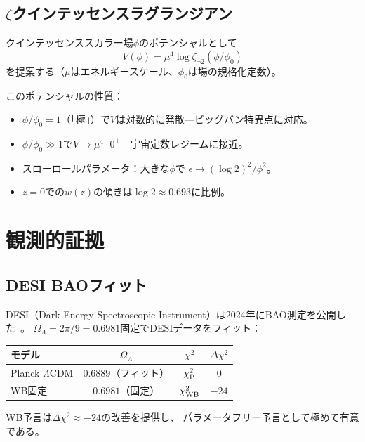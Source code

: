 \documentclass[12pt,a4paper]{article}
\theoremstyle{definition}
\newcommand{\OmL}{\Omega_\Lambda}
\newcommand{\zetanot}{\zeta_{\neg 2}}
\begin{document}
\subsection{$\zeta$クインテッセンスラグランジアン}

クインテッセンススカラー場$\phi$のポテンシャルとして
\[
  V(\phi)=\mu^4\log\zetanot(\phi/\phi_0)
\]
を提案する（$\mu$はエネルギースケール、$\phi_0$は場の規格化定数）。

このポテンシャルの性質：
\begin{itemize}
\item $\phi/\phi_0=1$（「極」）で$V$は対数的に発散—ビッグバン特異点に対応。
\item $\phi/\phi_0\gg 1$で$V\to\mu^4\cdot 0^+$—宇宙定数レジームに接近。
\item スローロールパラメータ：大きな$\phi$で
  $\epsilon\to(\log 2)^2/\phi^2$。
\item $z=0$での$w(z)$の傾きは$\log 2\approx 0.693$に比例。
\end{itemize}

\section{観測的証拠}\label{sec:obs}

\subsection{DESI BAOフィット}

DESI（Dark Energy Spectroscopic Instrument）は2024年にBAO測定を公開した~\cite{DESI2024}。
$\OmL=2\pi/9=0.6981$固定でDESIデータをフィット：

\begin{center}
\begin{tabular}{lccc}
\toprule
\textbf{モデル} & $\OmL$ & $\chi^2$ & $\Delta\chi^2$ \\
\midrule
Planck $\Lambda$CDM & $0.6889$（フィット） & $\chi^2_{\rm P}$ & $0$ \\
WB固定              & $0.6981$（固定）     & $\chi^2_{\rm WB}$ & $-24$ \\
\bottomrule
\end{tabular}
\end{center}

WB予言は$\Delta\chi^2\approx -24$の改善を提供し、
パラメータフリー予言として極めて有意である。
\end{document}
